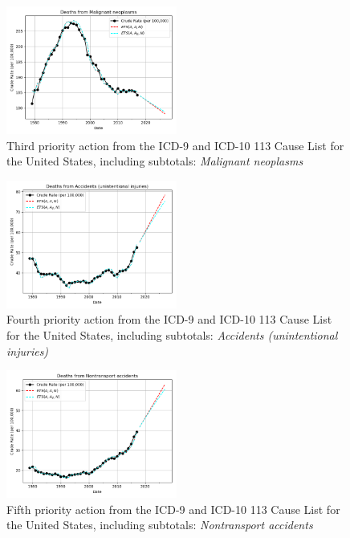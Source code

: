 \documentclass[10pt, a4paper, twocolumn]{IEEEconf}
\begin{document}
\begin{figure}[H]
  \centering
  \includegraphics[width=0.5\textwidth]{results/US_ICD_113_SELECTED_CAUSES_ALL/Malignant_neoplasms_ets.png}
  \caption{Third priority action from the ICD-9 and ICD-10 113 Cause List for the United States, including subtotals: \textit{Malignant neoplasms}}\label{fig:k3d}
\end{figure}

\begin{figure}[H]
  \centering
  \includegraphics[width=0.5\textwidth]{results/US_ICD_113_SELECTED_CAUSES_ALL/Accidents_unintentional_injuries_ets.png}
  \caption{Fourth priority action from the ICD-9 and ICD-10 113 Cause List for the United States, including subtotals: \textit{Accidents (unintentional injuries)}}\label{fig:k3e}
\end{figure}

\begin{figure}[H]
  \centering
  \includegraphics[width=0.5\textwidth]{results/US_ICD_113_SELECTED_CAUSES_ALL/Nontransport_accidents_ets.png}
  \caption{Fifth priority action from the ICD-9 and ICD-10 113 Cause List for the United States, including subtotals: \textit{Nontransport accidents}}\label{fig:k3c}
\end{figure}
\end{document}
